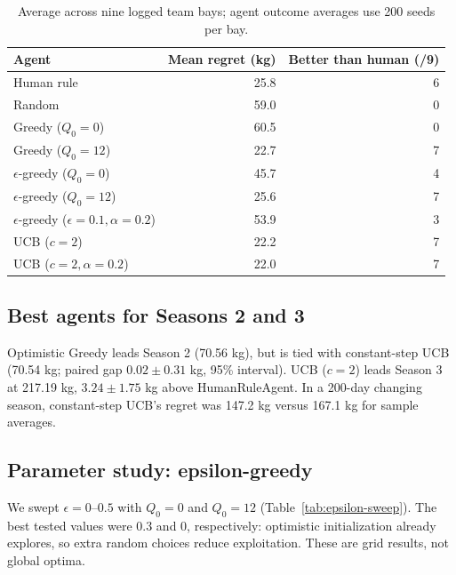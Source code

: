 \documentclass[11pt,a4paper]{article}
\begin{document}
\begin{table}[H]\centering\small
\begin{tabular}{lrr}\toprule
Agent & Mean regret (kg) & Better than human (/9)\\\midrule
Human rule & 25.8 & 6\\
Random & 59.0 & 0\\
Greedy ($Q_0=0$) & 60.5 & 0\\
Greedy ($Q_0=12$) & 22.7 & 7\\
$\epsilon$-greedy ($Q_0=0$) & 45.7 & 4\\
$\epsilon$-greedy ($Q_0=12$) & 25.6 & 7\\
$\epsilon$-greedy ($\epsilon=0.1,\alpha=0.2$) & 53.9 & 3\\
UCB ($c=2$) & 22.2 & 7\\
UCB ($c=2,\alpha=0.2$) & 22.0 & 7\\\bottomrule
\end{tabular}
\caption{Average across nine logged team bays; agent outcome averages use 200 seeds per bay.}
\label{tab:team-comparison}
\end{table}

\subsection{Best agents for Seasons 2 and 3}
Optimistic Greedy leads Season 2 (70.56 kg), but is tied with constant-step UCB (70.54 kg; paired gap $0.02\pm0.31$ kg, 95\% interval). UCB ($c=2$) leads Season 3 at 217.19 kg, $3.24\pm1.75$ kg above HumanRuleAgent. In a 200-day changing season, constant-step UCB's regret was 147.2 kg versus 167.1 kg for sample averages.

\subsection{Parameter study: epsilon-greedy}
We swept $\epsilon=0$--$0.5$ with $Q_0=0$ and $Q_0=12$ (Table~\ref{tab:epsilon-sweep}). The best tested values were $0.3$ and $0$, respectively: optimistic initialization already explores, so extra random choices reduce exploitation. These are grid results, not global optima.
\end{document}

